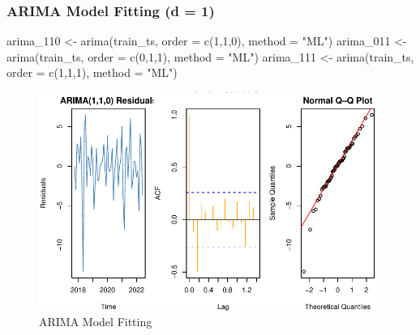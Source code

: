 \documentclass[
  11pt,
]{article}
\newenvironment{Shaded}{\begin{snugshade}}{\end{snugshade}}
\newcommand{\AttributeTok}[1]{\textcolor[rgb]{0.40,0.45,0.13}{#1}}
\newcommand{\DecValTok}[1]{\textcolor[rgb]{0.68,0.00,0.00}{#1}}
\newcommand{\FunctionTok}[1]{\textcolor[rgb]{0.28,0.35,0.67}{#1}}
\newcommand{\NormalTok}[1]{\textcolor[rgb]{0.00,0.23,0.31}{#1}}
\newcommand{\OtherTok}[1]{\textcolor[rgb]{0.00,0.23,0.31}{#1}}
\newcommand{\StringTok}[1]{\textcolor[rgb]{0.13,0.47,0.30}{#1}}
\begin{document}
\subsubsection{ARIMA Model Fitting (d =
1)}\label{arima-model-fitting-d-1}

\begin{Shaded}
\begin{Highlighting}[]
\NormalTok{arima\_110 }\OtherTok{\textless{}{-}} \FunctionTok{arima}\NormalTok{(train\_ts, }\AttributeTok{order =} \FunctionTok{c}\NormalTok{(}\DecValTok{1}\NormalTok{,}\DecValTok{1}\NormalTok{,}\DecValTok{0}\NormalTok{), }\AttributeTok{method =} \StringTok{"ML"}\NormalTok{)}
\NormalTok{arima\_011 }\OtherTok{\textless{}{-}} \FunctionTok{arima}\NormalTok{(train\_ts, }\AttributeTok{order =} \FunctionTok{c}\NormalTok{(}\DecValTok{0}\NormalTok{,}\DecValTok{1}\NormalTok{,}\DecValTok{1}\NormalTok{), }\AttributeTok{method =} \StringTok{"ML"}\NormalTok{)}
\NormalTok{arima\_111 }\OtherTok{\textless{}{-}} \FunctionTok{arima}\NormalTok{(train\_ts, }\AttributeTok{order =} \FunctionTok{c}\NormalTok{(}\DecValTok{1}\NormalTok{,}\DecValTok{1}\NormalTok{,}\DecValTok{1}\NormalTok{), }\AttributeTok{method =} \StringTok{"ML"}\NormalTok{)}
\end{Highlighting}
\end{Shaded}

\begin{figure}[H]

{\centering \includegraphics{project_files/figure-pdf/fig-ARIMA Model Fitting-1.pdf}

}

\caption{ARIMA Model Fitting}

\end{figure}%
\end{document}
